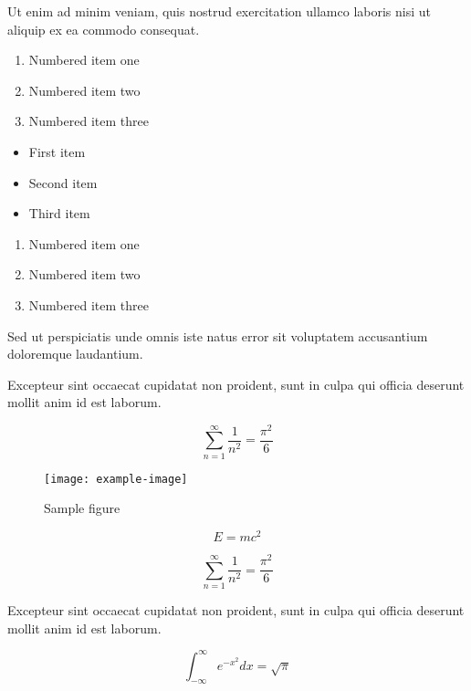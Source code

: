 \documentclass{article}
\begin{document}
Ut enim ad minim veniam, quis nostrud exercitation ullamco laboris nisi ut aliquip ex ea commodo consequat.

\begin{enumerate}
\item Numbered item one
\item Numbered item two
\item Numbered item three
\end{enumerate}

\begin{itemize}
\item First item
\item Second item
\item Third item
\end{itemize}


\begin{enumerate}
\item Numbered item one
\item Numbered item two
\item Numbered item three
\end{enumerate}

Sed ut perspiciatis unde omnis iste natus error sit voluptatem accusantium doloremque laudantium.

Excepteur sint occaecat cupidatat non proident, sunt in culpa qui officia deserunt mollit anim id est laborum.

\begin{equation}
    \sum_{n=1}^{\infty} \frac{1}{n^2} = \frac{\pi^2}{6}
\end{equation}

\begin{figure}[h]
    \centering
    \texttt{[image: example-image]}
    \caption{Sample figure}
    \label{fig:sample}
\end{figure}

\begin{equation}
    E = mc^2
\end{equation}

\begin{equation}
    \sum_{n=1}^{\infty} \frac{1}{n^2} = \frac{\pi^2}{6}
\end{equation}

Excepteur sint occaecat cupidatat non proident, sunt in culpa qui officia deserunt mollit anim id est laborum.

\begin{equation}
    \int_{-\infty}^{\infty} e^{-x^2} dx = \sqrt{\pi}
\end{equation}
\end{document}
